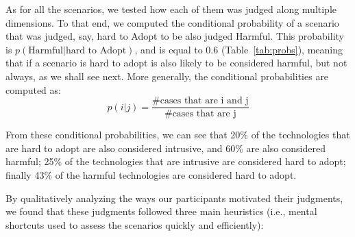 As for all the scenarios, we tested how each of them was judged along multiple dimensions. To that end, we computed the conditional probability of a scenario that was judged, say, hard to Adopt to be also judged Harmful. This probability is $p(\textrm{Harmful} | \textrm{hard to Adopt}) $, and is equal to 0.6 (Table~\ref{tab:probs}), meaning that if a scenario is hard to adopt is also likely to be considered harmful, but not always, as we shall see next. More generally, the conditional probabilities are computed as:
$$
p(i | j) = \frac{\# \textrm{cases that are i and j}}{\# \textrm{cases that are j}}$$


From these conditional probabilities, we can see that 20\% of the technologies that are hard to adopt are also considered intrusive, and 60\% are also considered harmful; 25\% of the technologies that are intrusive are considered hard to adopt; finally 43\% of the harmful technologies are considered hard to adopt.

By qualitatively analyzing the ways our participants motivated their judgments, we found that these judgments followed three main heuristics (i.e.,  mental shortcuts used to assess the scenarios quickly and efficiently):


